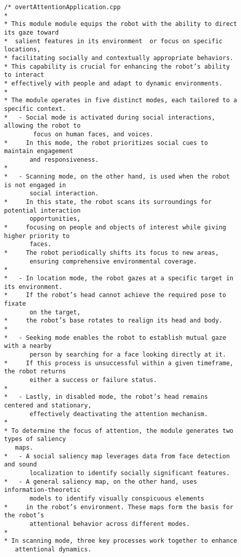 \documentclass{CSSRforAfrica}
\newcommand{\checkboxChecked}{\fbox{\ding{51}}} %
\begin{document}
\begin{description}

\item[\checkboxChecked] 
 {\small 
\begin{verbatim}
/* overtAttentionApplication.cpp
*
* This module module equips the robot with the ability to direct its gaze toward
*  salient features in its environment  or focus on specific locations, 
* facilitating socially and contextually appropriate behaviors. 
* This capability is crucial for enhancing the robot’s ability to interact 
* effectively with people and adapt to dynamic environments.
*
* The module operates in five distinct modes, each tailored to a specific context. 
*   - Social mode is activated during social interactions, allowing the robot to 
        focus on human faces, and voices. 
*     In this mode, the robot prioritizes social cues to maintain engagement 
       and responsiveness. 
*
*   - Scanning mode, on the other hand, is used when the robot is not engaged in 
       social interaction. 
*     In this state, the robot scans its surroundings for potential interaction 
       opportunities, 
*     focusing on people and objects of interest while giving higher priority to 
       faces. 
*     The robot periodically shifts its focus to new areas, 
       ensuring comprehensive environmental coverage.
*
*   - In location mode, the robot gazes at a specific target in its environment. 
*     If the robot’s head cannot achieve the required pose to fixate 
       on the target, 
*     the robot’s base rotates to realign its head and body. 
*
*   - Seeking mode enables the robot to establish mutual gaze with a nearby 
       person by searching for a face looking directly at it. 
*     If this process is unsuccessful within a given timeframe, the robot returns 
       either a success or failure status. 
*
*   - Lastly, in disabled mode, the robot’s head remains centered and stationary, 
       effectively deactivating the attention mechanism.
*
* To determine the focus of attention, the module generates two types of saliency 
   maps. 
*   - A social saliency map leverages data from face detection and sound 
       localization to identify socially significant features. 
*   - A general saliency map, on the other hand, uses information-theoretic 
       models to identify visually conspicuous elements 
*     in the robot’s environment. These maps form the basis for the robot’s 
       attentional behavior across different modes.
*
* In scanning mode, three key processes work together to enhance 
   attentional dynamics. 

\end{verbatim}}
\end{description}
\end{document}
